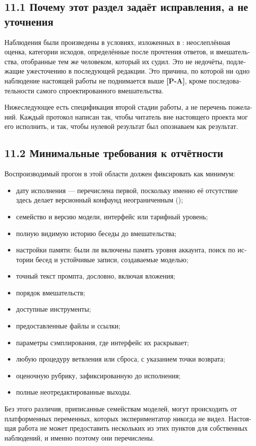 \begin{russian}
\subsection*{11.1 Почему этот раздел задаёт исправления, а не уточнения}
\label{sec:ru:11.1}

Наблюдения  были произведены в условиях, изложенных в : неослеплённая оценка, категории исходов, определённые после прочтения ответов, и вмешательства, отобранные тем же человеком, который их судил. Это не недочёты, подлежащие ужесточению в последующей редакции. Это причина, по которой ни одно наблюдение настоящей работы не поднимается выше \textbf{[P-A]}, кроме последовательности самого спроектированного вмешательства.

Нижеследующее есть спецификация второй стадии работы, а не перечень пожеланий. Каждый протокол написан так, чтобы читатель вне настоящего проекта мог его исполнить, и так, чтобы нулевой результат был опознаваем как результат.


\subsection*{11.2 Минимальные требования к отчётности}
\label{sec:ru:11.2}

Воспроизводимый прогон в этой области должен фиксировать как минимум:

\begin{itemize}
  \item дату исполнения — перечислена первой, поскольку именно её отсутствие здесь делает версионный конфаунд неограниченным ();
  \item семейство и версию модели, интерфейс или тарифный уровень;
  \item полную видимую историю беседы до вмешательства;
  \item настройки памяти: были ли включены память уровня аккаунта, поиск по истории бесед и устойчивые записи, создаваемые моделью;
  \item точный текст промпта, дословно, включая вложения;
  \item порядок вмешательств;
  \item доступные инструменты;
  \item предоставленные файлы и ссылки;
  \item параметры сэмплирования, где интерфейс их раскрывает;
  \item любую процедуру ветвления или сброса, с указанием точки возврата;
  \item оценочную рубрику, зафиксированную до исполнения;
  \item полные неотредактированные выходы.
\end{itemize}
Без этого различия, приписанные семействам моделей, могут происходить от платформенных переменных, которых экспериментатор никогда не видел. Настоящая работа не может предоставить нескольких из этих пунктов для собственных наблюдений, и именно поэтому они перечислены.



\end{russian}
